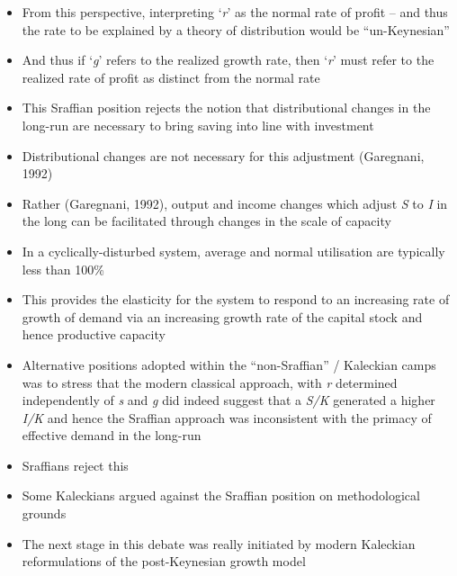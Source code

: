 \documentclass[a4paper,twoside]{article}
\numberwithin{equation}{section}
\numberwithin{figure}{section}
\begin{document}
	\begin{itemize}
		\item From this perspective, interpreting `\textit{r}' as the normal rate of profit -- and thus the rate to be explained by a theory of distribution would be ``un-Keynesian''
		\item And thus if `\textit{g}' refers to the realized growth rate, then `\textit{r}' must refer to the realized rate of profit as distinct from the normal rate
		\item This Sraffian position rejects the notion that distributional changes in the long-run are necessary to bring saving into line with investment
		\item Distributional changes are not necessary for this adjustment (Garegnani, 1992)
		\item Rather (Garegnani, 1992), output and income changes which adjust \textit{S} to \textit{I} in the long can be facilitated through changes in the scale of capacity
		\item In a cyclically-disturbed system, average and normal utilisation are typically less than 100\%
		\item This provides the elasticity for the system to respond to an increasing rate of growth of demand via an increasing growth rate of the capital stock and hence productive capacity
		\item Alternative positions adopted within the ``non-Sraffian'' / Kaleckian camps was to stress that the modern classical approach, with \textit{r} determined independently of \textit{s} and \textit{g} did indeed suggest that a \textit{S/K} generated a higher \textit{I/K} and hence the Sraffian approach was inconsistent with the primacy of effective demand in the long-run
		\item Sraffians reject this
		\item Some Kaleckians argued against the Sraffian position on methodological grounds
		\item The next stage in this debate was really initiated by modern Kaleckian reformulations of the post-Keynesian growth model
	\end{itemize}
\end{document}

